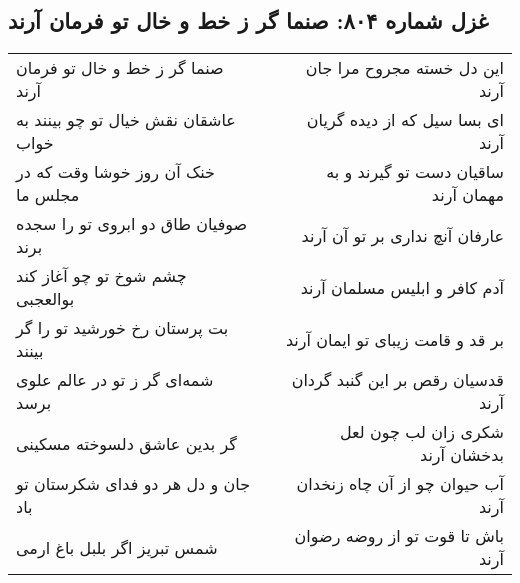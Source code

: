 \begin{center}
\section*{غزل شماره ۸۰۴: صنما گر ز خط و خال تو فرمان آرند}
\label{sec:0804}
\begin{longtable}{l p{0.5cm} r}
صنما گر ز خط و خال تو فرمان آرند
&&
این دل خسته مجروح مرا جان آرند
\\
عاشقان نقش خیال تو چو بینند به خواب
&&
ای بسا سیل که از دیده گریان آرند
\\
خنک آن روز خوشا وقت که در مجلس ما
&&
ساقیان دست تو گیرند و به مهمان آرند
\\
صوفیان طاق دو ابروی تو را سجده برند
&&
عارفان آنچ نداری بر تو آن آرند
\\
چشم شوخ تو چو آغاز کند بوالعجبی
&&
آدم کافر و ابلیس مسلمان آرند
\\
بت پرستان رخ خورشید تو را گر بینند
&&
بر قد و قامت زیبای تو ایمان آرند
\\
شمه‌ای گر ز تو در عالم علوی برسد
&&
قدسیان رقص بر این گنبد گردان آرند
\\
گر بدین عاشق دلسوخته مسکینی
&&
شکری زان لب چون لعل بدخشان آرند
\\
جان و دل هر دو فدای شکرستان تو باد
&&
آب حیوان چو از آن چاه زنخدان آرند
\\
شمس تبریز اگر بلبل باغ ارمی
&&
باش تا قوت تو از روضه رضوان آرند
\\
\end{longtable}
\end{center}
